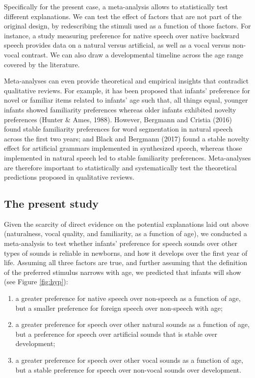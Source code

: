 \documentclass[man]{apa6}
\providecommand{\tightlist}{%
  \setlength{\itemsep}{0pt}\setlength{\parskip}{0pt}}
\begin{document}
Specifically for the present case, a meta-analysis allows to
statistically test different explanations. We can test the effect of
factors that are not part of the original design, by redescribing the
stimuli used as a function of those factors. For instance, a study
measuring preference for native speech over native backward speech
provides data on a natural versus artificial, as well as a vocal versus
non-vocal contrast. We can also draw a developmental timeline across the
age range covered by the literature.

Meta-analyses can even provide theoretical and empirical insights that
contradict qualitative reviews. For example, it has been proposed that
infants' preference for novel or familiar items related to infants' age
such that, all things equal, younger infants showed familiarity
preferences whereas older infants exhibited novelty preferences (Hunter
\& Ames, 1988). However, Bergmann and Cristia (2016) found stable
familiarity preferences for word segmentation in natural speech across
the first two years; and Black and Bergmann (2017) found a stable
novelty effect for artificial grammars implemented in synthesized
speech, whereas those implemented in natural speech led to stable
familiarity preferences. Meta-analyses are therefore important to
statistically and systematically test the theoretical predictions
proposed in qualitative reviews.

\subsection{The present study}\label{the-present-study}

Given the scarcity of direct evidence on the potential explanations laid
out above (naturalness, vocal quality, and familiarity, as a function of
age), we conducted a meta-analysis to test whether infants' preference
for speech sounds over other types of sounds is reliable in newborns,
and how it develops over the first year of life. Assuming all three
factors are true, and further assuming that the definition of the
preferred stimulus narrows with age, we predicted that infants will show
(see Figure \ref{fig:hyp}):

\begin{enumerate}
\def\labelenumi{\arabic{enumi}.}
\tightlist
\item
  a greater preference for native speech over non-speech as a function
  of age, but a smaller preference for foreign speech over non-speech
  with age;
\item
  a greater preference for speech over other natural sounds as a
  function of age, but a preference for speech over artificial sounds
  that is stable over development;
\item
  a greater preference for speech over other vocal sounds as a function
  of age, but a stable preference for speech over non-vocal sounds over
  development.
\end{enumerate}
\end{document}
